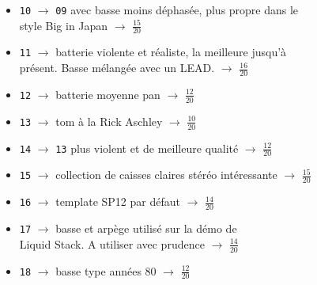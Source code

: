 \documentclass[a4paper, 13pt]{article}
\begin{document}
\begin{itemize}
    \item \texttt{10} $\rightarrow$ \texttt{09} avec basse moins déphasée, plus propre dans le \\ style Big in Japan $\rightarrow$ \Large{$\frac{15}{20}$} \normalsize \vspace{0.2cm}
    \item \texttt{11} $\rightarrow$ batterie violente et réaliste, la meilleure jusqu'à \\ présent. Basse mélangée avec un LEAD. $\rightarrow$ \Large{$\frac{16}{20}$} \normalsize \vspace{0.2cm}
    \item \texttt{12} $\rightarrow$ batterie moyenne pan $\rightarrow$ \Large{$\frac{12}{20}$} \normalsize \vspace{0.2cm}
    \item \texttt{13} $\rightarrow$ tom à la Rick Aschley $\rightarrow$ \Large{$\frac{10}{20}$} \normalsize \vspace{0.2cm}
    \item \texttt{14} $\rightarrow$ \texttt{13} plus violent et de meilleure qualité $\rightarrow$ \Large{$\frac{12}{20}$} \normalsize \vspace{0.2cm}
    \item \texttt{15} $\rightarrow$ collection de caisses claires stéréo intéressante $\rightarrow$ \Large{$\frac{15}{20}$} \normalsize \vspace{0.2cm}
    \item \texttt{16} $\rightarrow$ template SP12 par défaut $\rightarrow$ \Large{$\frac{14}{20}$} \normalsize \vspace{0.2cm}
    \item \texttt{17} $\rightarrow$ basse et arpège utilisé sur la démo de \\ Liquid Stack. A utiliser avec prudence $\rightarrow$ \Large{$\frac{14}{20}$} \normalsize \vspace{0.2cm}
    \item \texttt{18} $\rightarrow$ basse type années 80 $\rightarrow$ \Large{$\frac{12}{20}$} \normalsize \vspace{0.2cm}
\end{itemize}


\vspace{1cm}
\end{document}
